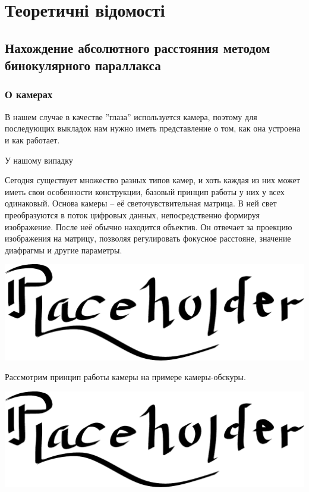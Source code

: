 \chapter{Теоретичні відомості}

\section{Нахождение абсолютного расстояния методом бинокулярного параллакса}
\subsection{О камерах}

В нашем случае в качестве ''глаза'' используется камера, поэтому для последующих выкладок нам нужно иметь представление о том, как она устроена и как работает.

У нашому випадку

Сегодня существует множество разных типов камер, и хоть каждая из них может иметь свои особенности конструкции, базовый принцип работы у них у всех одинаковый.
Основа камеры -- её светочувствительная матрица. В ней свет преобразуются в поток цифровых данных, непосредственно формируя изображение. После неё обычно находится объектив. Он отвечает за проекцию изображения на матрицу, позволяя регулировать фокусное расстояне, значение диафрагмы и другие параметры. 

\includegraphics[scale = 0.75]{placeholder}
		
Рассмотрим принцип работы камеры на примере камеры-обскуры. 
	
\includegraphics[scale = 0.75]{placeholder}

